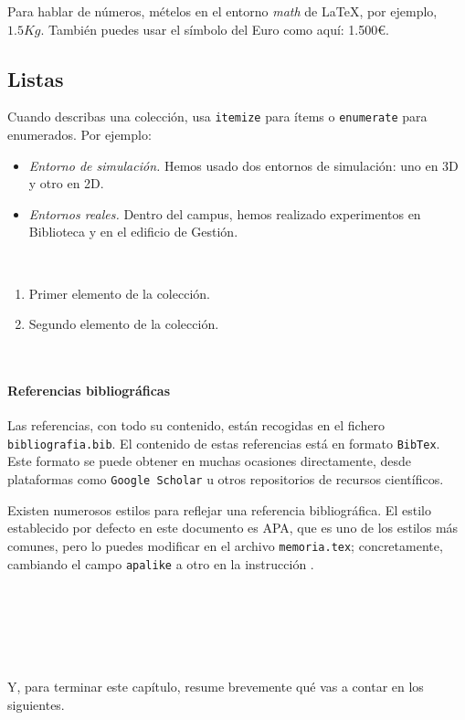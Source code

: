 Para hablar de números, mételos en el entorno \textit{math} de \LaTeX, por ejemplo, $1.5Kg$. También puedes usar el símbolo del Euro como aquí: 1.500\euro.

\subsection{Listas}

Cuando describas una colección, usa \texttt{itemize} para ítems o \texttt{enumerate} para enumerados. Por ejemplo:

\begin{itemize}
 \item \textit{Entorno de simulación.} Hemos usado dos entornos de simulación: uno en 3D y otro en 2D.
 \item \textit{Entornos reales.} Dentro del campus, hemos realizado experimentos en Biblioteca y en el edificio de Gestión.
\end{itemize}\

\begin{enumerate}
 \item Primer elemento de la colección.
 \item Segundo elemento de la colección.
\end{enumerate}\

\paragraph{Referencias bibliográficas}
\label{sec:referencias}


Las referencias, con todo su contenido, están recogidas en el fichero \texttt{bibliografia.bib}. El contenido de estas referencias está en formato \texttt{BibTex}. Este formato se puede obtener en muchas ocasiones directamente, desde plataformas como \texttt{Google Scholar} u otros repositorios de recursos científicos.

Existen numerosos estilos para reflejar una referencia bibliográfica. El estilo establecido por defecto en este documento es APA, que es uno de los estilos más comunes, pero lo puedes modificar en el archivo \texttt{memoria.tex}; concretamente, cambiando el campo \verb|apalike| a otro en la instrucción \verb||. 

\

\

\

Y, para terminar este capítulo, resume brevemente qué vas a contar en los siguientes.

